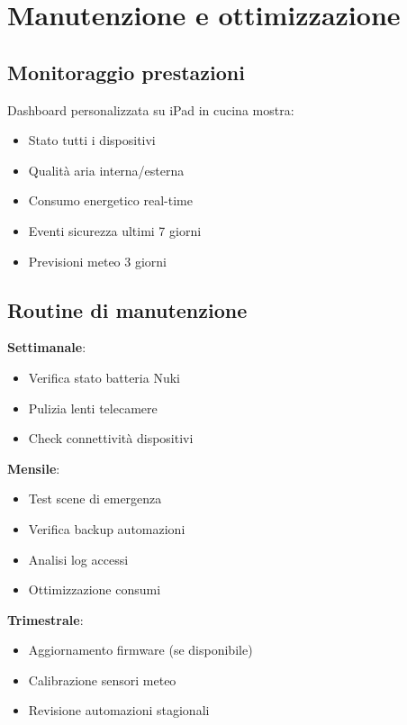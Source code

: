 \section{Manutenzione e ottimizzazione}

\subsection{Monitoraggio prestazioni}

Dashboard personalizzata su iPad in cucina mostra:
\begin{itemize}
    \item Stato tutti i dispositivi
    \item Qualità aria interna/esterna
    \item Consumo energetico real-time
    \item Eventi sicurezza ultimi 7 giorni
    \item Previsioni meteo 3 giorni
\end{itemize}

\subsection{Routine di manutenzione}

\textbf{Settimanale}:
\begin{itemize}
    \item Verifica stato batteria Nuki
    \item Pulizia lenti telecamere
    \item Check connettività dispositivi
\end{itemize}

\textbf{Mensile}:
\begin{itemize}
    \item Test scene di emergenza
    \item Verifica backup automazioni
    \item Analisi log accessi
    \item Ottimizzazione consumi
\end{itemize}

\textbf{Trimestrale}:
\begin{itemize}
    \item Aggiornamento firmware (se disponibile)
    \item Calibrazione sensori meteo
    \item Revisione automazioni stagionali
\end{itemize}

